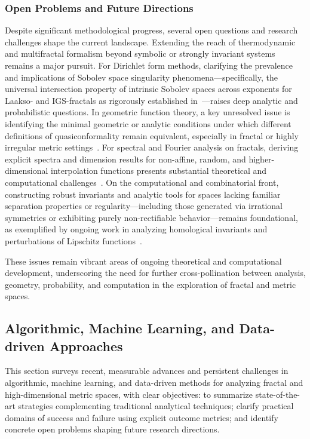 \documentclass[sigconf]{acmart}
\begin{document}
\subsubsection*{Open Problems and Future Directions}

Despite significant methodological progress, several open questions and research challenges shape the current landscape. Extending the reach of thermodynamic and multifractal formalism beyond symbolic or strongly invariant systems remains a major pursuit. For Dirichlet form methods, clarifying the prevalence and implications of Sobolev space singularity phenomena---specifically, the universal intersection property of intrinsic Sobolev spaces across exponents for Laakso- and IGS-fractals as rigorously established in~\cite{ref13}---raises deep analytic and probabilistic questions. In geometric function theory, a key unresolved issue is identifying the minimal geometric or analytic conditions under which different definitions of quasiconformality remain equivalent, especially in fractal or highly irregular metric settings~\cite{ref47}. For spectral and Fourier analysis on fractals, deriving explicit spectra and dimension results for non-affine, random, and higher-dimensional interpolation functions presents substantial theoretical and computational challenges~\cite{ref28,ref32,ref33,ref34}. On the computational and combinatorial front, constructing robust invariants and analytic tools for spaces lacking familiar separation properties or regularity---including those generated via irrational symmetries or exhibiting purely non-rectifiable behavior---remains foundational, as exemplified by ongoing work in analyzing homological invariants and perturbations of Lipschitz functions~\cite{ref20,ref43}.

These issues remain vibrant areas of ongoing theoretical and computational development, underscoring the need for further cross-pollination between analysis, geometry, probability, and computation in the exploration of fractal and metric spaces.

\subsection{Algorithmic, Machine Learning, and Data-driven Approaches}

This section surveys recent, measurable advances and persistent challenges in algorithmic, machine learning, and data-driven methods for analyzing fractal and high-dimensional metric spaces, with clear objectives: to summarize state-of-the-art strategies complementing traditional analytical techniques; clarify practical domains of success and failure using explicit outcome metrics; and identify concrete open problems shaping future research directions. 
\end{document}

